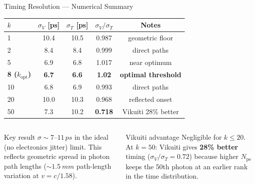 \documentclass[aspectratio=169,10pt]{beamer}
\begin{document}
\begin{frame}{Timing Resolution — Numerical Summary}

\begin{center}
\small
\renewcommand{\arraystretch}{1.25}
\begin{tabular}{@{}lSSSS@{}}
  \toprule
  \textbf{$k$} &
  {\textbf{$\sigma_V$ [ps]}} &
  {\textbf{$\sigma_T$ [ps]}} &
  {\textbf{$\sigma_V/\sigma_T$}} &
  {\textbf{Notes}} \\
                & 10.4 & 10.5 & 0.987 & {geometric floor} \\
  2              &  8.4 &  8.4 & 0.999 & {direct paths} \\
  5              &  6.9 &  6.8 & 1.017 & {near optimum} \\
  \bfseries{8 ($k_\text{opt}$)} & \bfseries{6.7} & \bfseries{6.6} & \bfseries{1.02} & \bfseries{optimal threshold} \\
  10             &  6.8 &  6.9 & 0.993 & {direct paths} \\
  20             & 10.0 & 10.3 & 0.968 & {reflected onset} \\
  50             &  7.3 & 10.2 & \textbf{0.718} & {Vikuiti 28\% better} \\
  \bottomrule
\end{tabular}
\end{center}

\vspace{0.4em}
\begin{columns}[T]
  \begin{column}{0.48\textwidth}
  \begin{alertblock}{Key result}
    $\sigma \sim 7$--$11\,\si{ps}$ in the ideal (no electronics jitter) limit.
    This reflects geometric spread in photon path lengths
    ($\sim\!\SI{1.5}{mm}$ path-length variation at $v=c/1.58$).
  \end{alertblock}
  \end{column}
  \begin{column}{0.48\textwidth}
  \begin{alertblock}{Vikuiti advantage}
    Negligible for $k \leq 20$.
    At $k=50$: Vikuiti gives \textbf{28\% better} timing
    ($\sigma_V / \sigma_T = 0.72$) because higher $N_\text{pe}$ keeps
    the 50th photon at an earlier rank in the time distribution.
  \end{alertblock}
  \end{column}
\end{columns}

\end{frame}
\end{document}
